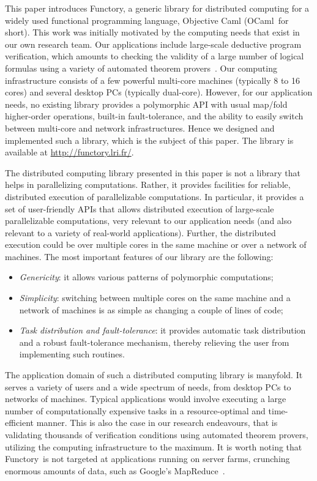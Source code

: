 \documentclass{llncs}
\newcommand{\Ocaml}{OCaml}
\newcommand{\functory}{\textsf{Functory}}
\begin{document}
This paper introduces \functory, a generic library for distributed
computing for a widely used functional programming language,
Objective Caml (\Ocaml\ for short). 
This work was initially motivated by the computing needs that
exist in our own research team. Our applications include large-scale
deductive program verification, which amounts to checking the validity
of a large number of logical formulas using a variety of automated
theorem provers~\cite{filliatre07cav}. Our computing infrastructure
consists of a few powerful multi-core machines (typically 8 to 16
cores) and several desktop PCs (typically dual-core). However, for our
application needs, no existing library provides a polymorphic API with
usual map/fold higher-order operations, built-in fault-tolerance, and
the ability to easily switch between multi-core and network
infrastructures.
Hence we designed and implemented such a library, which is
the subject of this paper.  
The library is available at 
\href{http://functory.lri.fr/}{\url{http://functory.lri.fr/}}.

The distributed computing library presented in this paper is not a
library that helps in parallelizing computations. Rather, it provides
facilities for reliable, distributed execution of parallelizable
computations. In particular, it provides a set of user-friendly APIs
that allows distributed execution of large-scale parallelizable
computations, very relevant to our application needs (and also
relevant to a variety of real-world applications). Further, the
distributed execution could be over multiple cores in the same machine
or over a network of machines. The most important features of our
library are the following:
\begin{itemize}
\item \emph{Genericity}: 
  it allows various patterns of polymorphic computations;
\item \emph{Simplicity}: switching between multiple cores on the same
  machine and a network of machines is as simple as changing a couple
  of lines of code;
\item \emph{Task distribution and fault-tolerance}: 
  it provides automatic task distribution and
  a robust fault-tolerance mechanism, thereby
  relieving the user from implementing such routines.
\end{itemize}
The application domain of such a distributed computing library is manyfold. 
It serves a variety of users and a wide spectrum of
needs, from desktop PCs to networks of machines.  Typical applications
would involve executing a large number of computationally expensive tasks
in a resource-optimal and time-efficient manner. This is also the case
in our research endeavours, that is validating thousands of
verification conditions using automated theorem provers, utilizing the
computing infrastructure to the maximum.
It is worth noting that 
\functory\ is not targeted at applications running on server farms,
crunching enormous amounts of data, such as Google's
MapReduce~\cite{mapreduce}.  
\end{document}
